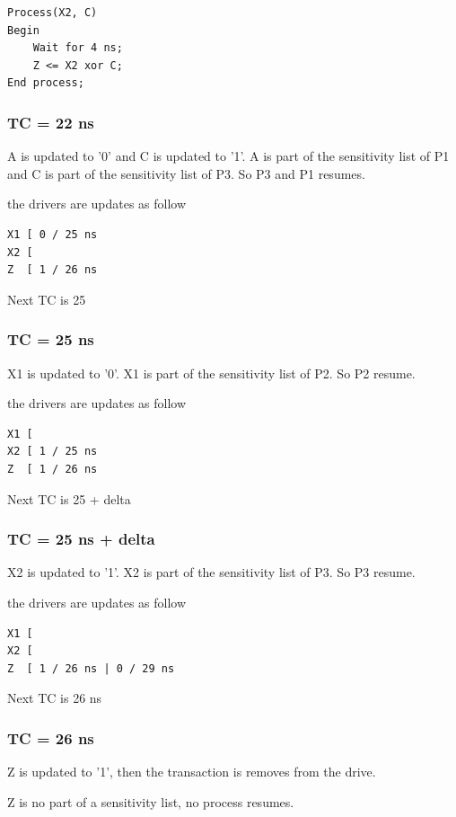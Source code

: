 \documentclass{article}
\begin{document}
\begin{verbatim}
Process(X2, C)
Begin
	Wait for 4 ns;
	Z <= X2 xor C;
End process;
\end{verbatim}

\subsubsection{TC = 22 ns}
A is updated to '0' and C is updated to '1'.
A is  part of the sensitivity list of P1 and C is part of the sensitivity list of P3. So P3 and P1 resumes.  

the drivers are updates as follow 

\begin{verbatim}
X1 [ 0 / 25 ns 
X2 [
Z  [ 1 / 26 ns
\end{verbatim}

Next TC is 25 

\subsubsection{TC = 25 ns}
X1 is updated to '0'. X1 is part of the sensitivity list of P2. So P2 resume.  


the drivers are updates as follow 

\begin{verbatim}
X1 [ 
X2 [ 1 / 25 ns
Z  [ 1 / 26 ns
\end{verbatim}

Next TC is 25 + delta 

\subsubsection{TC = 25 ns + delta}
X2 is updated to '1'. X2 is part of the sensitivity list of P3. So P3 resume.  

the drivers are updates as follow 

\begin{verbatim}
X1 [ 
X2 [ 
Z  [ 1 / 26 ns | 0 / 29 ns 
\end{verbatim}

Next TC is 26 ns

\subsubsection{TC = 26 ns}

Z is updated to '1', then the transaction is removes from the drive.

Z is no part of a sensitivity list, no process resumes.
\end{document}
